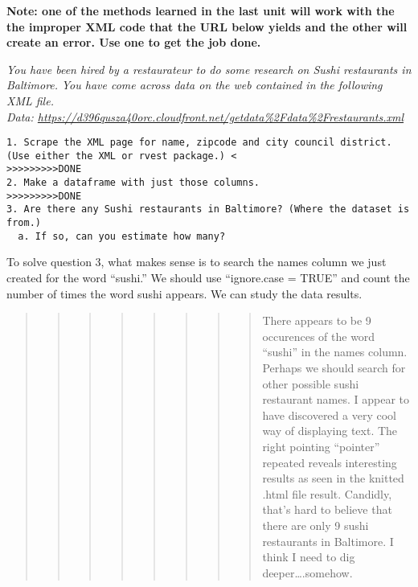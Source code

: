 \documentclass[
]{article}
\begin{document}
\textbf{Note: one of the methods learned in the last unit will work with
the the improper XML code that the URL below yields and the other will
create an error. Use one to get the job done.}

\emph{You have been hired by a restaurateur to do some research on Sushi
restaurants in Baltimore.} \emph{You have come across data on the web
contained in the following XML file.}\\
\emph{Data:
\url{https://d396qusza40orc.cloudfront.net/getdata\%2Fdata\%2Frestaurants.xml}}

\begin{verbatim}
1. Scrape the XML page for name, zipcode and city council district.  (Use either the XML or rvest package.) <
>>>>>>>>>DONE
2. Make a dataframe with just those columns.  
>>>>>>>>>DONE
3. Are there any Sushi restaurants in Baltimore? (Where the dataset is from.)
  a. If so, can you estimate how many?
\end{verbatim}

To solve question 3, what makes sense is to search the names column we
just created for the word ``sushi.'' We should use ``ignore.case =
TRUE'' and count the number of times the word sushi appears. We can
study the data results.

\begin{quote}
\begin{quote}
\begin{quote}
\begin{quote}
\begin{quote}
\begin{quote}
\begin{quote}
\begin{quote}
There appears to be 9 occurences of the word ``sushi'' in the names
column. Perhaps we should search for other possible sushi restaurant
names. I appear to have discovered a very cool way of displaying text.
The right pointing ``pointer'' repeated reveals interesting results as
seen in the knitted .html file result. Candidly, that's hard to believe
that there are only 9 sushi restaurants in Baltimore. I think I need to
dig deeper\ldots.somehow.
\end{quote}
\end{quote}
\end{quote}
\end{quote}
\end{quote}
\end{quote}
\end{quote}
\end{quote}
\end{document}
